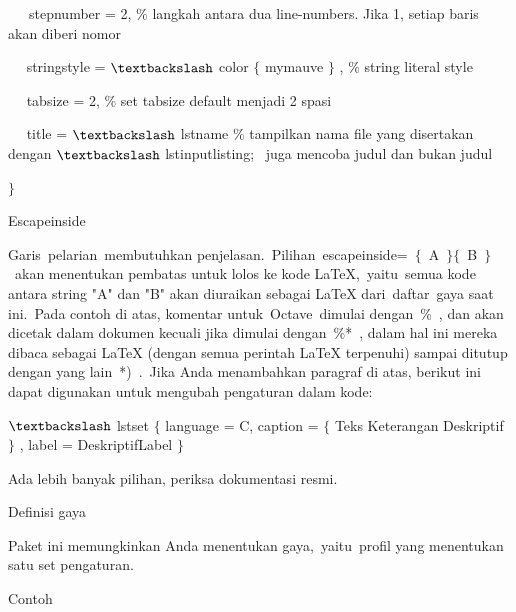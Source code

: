 ~~~stepnumber = 2, $\%$ langkah antara dua line-numbers.  Jika 1, setiap baris akan diberi nomor\par

~~ stringstyle = $\textbackslash$ color $ \{ $ mymauve $ \} $ , $\%$ string literal style\par

~~ tabsize = 2, $\%$ set tabsize default menjadi 2 spasi\par

~~ title = $\textbackslash$ lstname $\%$ tampilkan nama file yang disertakan dengan $\textbackslash$ lstinputlisting;~ juga mencoba judul dan bukan judul\par

 $ \} $\par

Escapeinside\par

Garis pelarian membutuhkan penjelasan. Pilihan escapeinside= $ \{ $ A $ \} $$ \{ $ B $ \} $ akan menentukan pembatas untuk lolos ke kode LaTeX, yaitu semua kode antara string "A" dan "B" akan diuraikan sebagai LaTeX dari daftar gaya saat ini. Pada contoh di atas, komentar untuk Octave dimulai dengan $\%$ , dan akan dicetak dalam dokumen kecuali jika dimulai dengan $\%$* , dalam hal ini mereka dibaca sebagai LaTeX (dengan semua perintah LaTeX terpenuhi) sampai ditutup dengan yang lain *) . Jika Anda menambahkan paragraf di atas, berikut ini dapat digunakan untuk mengubah pengaturan dalam kode:\par

$\textbackslash$ lstset $ \{ $ language = C, caption = $ \{ $ Teks Keterangan Deskriptif $ \} $ , label = DeskriptifLabel $ \} $\par

Ada lebih banyak pilihan, periksa dokumentasi resmi.\par

Definisi gaya \par

Paket ini memungkinkan Anda menentukan gaya, yaitu profil yang menentukan satu set pengaturan.\par

Contoh\par

